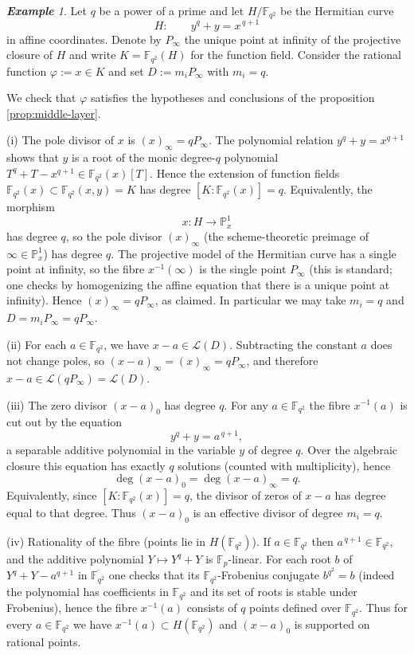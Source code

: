 \documentclass[14pt]{amsart}
\theoremstyle{plain}
\theoremstyle{definition}
\theoremstyle{remark}
\newtheorem{exam}[thm]{\bf Example}
\theoremstyle{example}
\def \P{\mathbb{P}}
\def \F{\mathbb{F}}
\begin{document}
\begin{exam} %
\label{ex:hermitian-x}
Let $q$ be a power of a prime and let $H/\F_{q^2}$ be the Hermitian curve
$$
H:\qquad y^q+y = x^{\,q+1}
$$
in affine coordinates. Denote by $P_\infty$ the unique point at infinity of
the projective closure of $H$ and write $K=\F_{q^2}(H)$ for the function field.
Consider the rational function $\varphi:=x\in K$ and set $D:=m_iP_\infty$ with $m_i=q$.

We check that $\varphi$ satisfies the hypotheses and conclusions of the proposition \ref{prop:middle-layer}.

\medskip\noindent (i) The pole divisor of $x$ is $(x)_\infty = qP_\infty$. 
The polynomial relation $y^q+y=x^{q+1}$ shows that $y$ is a root of the
monic degree-$q$ polynomial $T^q+T-x^{q+1}\in\F_{q^2}(x)[T]$. Hence the
extension of function fields $\F_{q^2}(x)\subset \F_{q^2}(x,y)=K$ has degree
$[K:\F_{q^2}(x)]=q$. Equivalently, the morphism
$$
x : H \longrightarrow \P^1_x
$$
has degree $q$, so the pole divisor $(x)_\infty$ (the scheme-theoretic preimage
of $\infty\in\P^1_x$) has degree $q$. The projective model of the Hermitian
curve has a single point at infinity, so the fibre $x^{-1}(\infty)$ is the
single point $P_\infty$ (this is standard; one checks by homogenizing the
affine equation that there is a unique point at infinity). Hence
$(x)_\infty = qP_\infty$, as claimed. In particular we may take $m_i=q$ and
$D=m_iP_\infty=qP_\infty$.

\medskip\noindent (ii) For each $a\in\F_{q^2}$, we have $x-a\in\mathcal L(D)$.
Subtracting the constant $a$ does not change poles, so $(x-a)_\infty=(x)_\infty=qP_\infty$,
and therefore $x-a\in \mathcal L(qP_\infty)=\mathcal L(D)$.

\medskip\noindent (iii) The zero divisor $(x-a)_0$ has degree $q$.
For any $a\in\F_{q^2}$ the fibre $x^{-1}(a)$ is cut out by the equation
$$
y^q + y = a^{\,q+1},
$$
a separable additive polynomial in the variable $y$ of degree $q$. Over the
algebraic closure this equation has exactly $q$ solutions (counted with
multiplicity), hence
$$
\deg (x-a)_0  =  \deg (x-a)_\infty  =  q.
$$
Equivalently, since $[K:\F_{q^2}(x)]=q$, the divisor of zeros of $x-a$ has
degree equal to that degree. Thus $(x-a)_0$ is an effective divisor of degree
$m_i=q$.

\medskip\noindent (iv) Rationality of the fibre (points lie in $H(\F_{q^2})$).
If $a\in\F_{q^2}$ then $a^{\,q+1}\in\F_{q^2}$, and the additive polynomial
$Y\mapsto Y^q+Y$ is $\F_p$-linear. For each root $b$ of $Y^q+Y-a^{q+1}$ in
$\overline{\F_{q^2}}$ one checks that its $\F_{q^2}$-Frobenius conjugate
$b^{q^2}=b$ (indeed the polynomial has coefficients in $\F_{q^2}$ and its
set of roots is stable under Frobenius), hence the fibre $x^{-1}(a)$ consists
of $q$ points defined over $\F_{q^2}$. Thus for every $a\in\F_{q^2}$ we have
$x^{-1}(a)\subset H(\F_{q^2})$ and $(x-a)_0$ is supported on rational points.


\end{exam}
\end{document}
